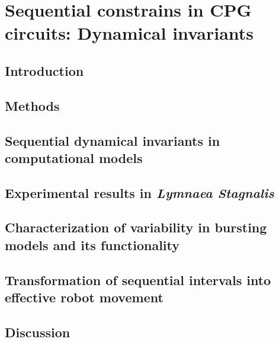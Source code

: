 \chapter{Sequential constrains in CPG circuits: Dynamical invariants}
\label{c-invariants}
\section{Introduction}

\section{Methods}

\section{Sequential dynamical invariants in computational models}
\label{c-invariants-model}

\section{Experimental results in \textit{Lymnaea Stagnalis}}
\label{sec:experimental sussex}

\section{Characterization of variability in bursting models and its functionality}
\label{sec:model variability}

\section{Transformation of sequential intervals into effective robot movement}
\label{sec:robot}

\section{Discussion}
